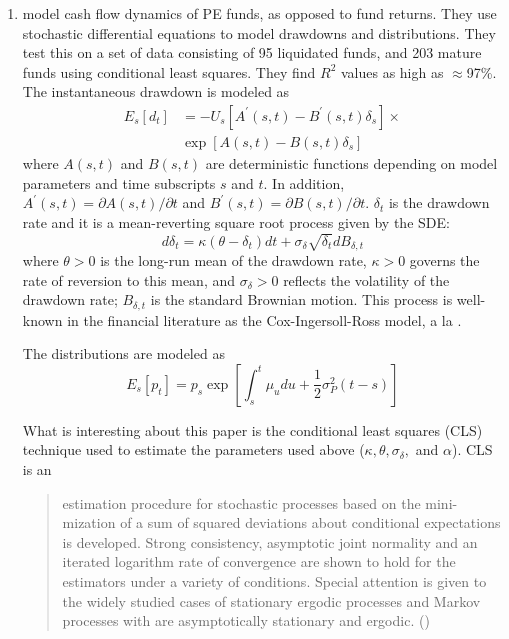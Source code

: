 \documentclass[final,5p,times,twocolumn,authoryear]{elsarticle}
\begin{document}
\begin{enumerate}[resume, label=(\roman*)]

	\item \cite{Buchner2009} model cash flow dynamics of PE funds, as opposed to fund returns. They use stochastic differential equations to model drawdowns and distributions. They test this on a set of data consisting of 95 liquidated funds, and 203 mature funds using conditional least squares. They find $R^2$ values as high as $\approx$97\%. The instantaneous drawdown is modeled as
	\begin{equation}
	\begin{split}
		E_s\left[d_t\right] &= -U_s\left[A^\prime(s,t) - B^\prime(s,t) \delta_s\right] \times \\
		&\exp \left[A(s,t) - B(s,t)\delta_s\right]
	\end{split}
	\end{equation}
	where $A(s,t)$ and $B(s,t)$ are deterministic functions depending on model parameters and time subscripts $s$ and $t$. In addition, $A^\prime(s,t) = \partial A(s,t) / \partial t$ and $B^\prime (s,t) = \partial B(s, t) / \partial t$. $\delta_t$ is the drawdown rate and it is a mean-reverting square root process given by the SDE:
	\begin{equation}
		d\delta_t = \kappa (\theta - \delta_t)dt + \sigma_\delta \sqrt{\delta_t} dB_{\delta,t}
	\end{equation}
	where $\theta > 0$ is the long-run mean of the drawdown rate, $\kappa > 0$ governs the rate of reversion to this mean, and $\sigma_\delta > 0$ reflects the volatility of the drawdown rate; $B_{\delta, t}$ is the standard Brownian motion. This process is well-known in the financial literature as the Cox-Ingersoll-Ross model, a la \cite{Cox1985}. 
	
	The distributions are modeled as 
	\begin{equation}
		E_s \left[ p_t \right] = p_s \exp \left[ \int_s^t \mu_u du + \frac{1}{2} \sigma_P^2 ( t - s ) \right]
	\end{equation}
	
	What is interesting about this paper is the conditional least squares (CLS) technique used to estimate the parameters used above ($\kappa, \theta, \sigma_\delta,$ and $\alpha$). CLS is an 
	\begin{quote}
		estimation procedure for stochastic processes based on the mini- mization of a sum of squared deviations about conditional expectations is developed. Strong consistency, asymptotic joint normality and an iterated logarithm rate of convergence are shown to hold for the estimators under a variety of conditions. Special attention is given to the widely studied cases of stationary ergodic processes and Markov processes with are asymptotically stationary and ergodic. (\cite{Klimko1978})
	\end{quote}


\end{enumerate}
\end{document}

